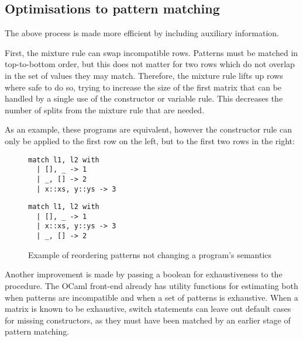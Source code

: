 

\subsection{Optimisations to pattern matching}
The above process is made more efficient by including auxiliary information. %


First, the mixture rule can swap incompatible rows. Patterns must be matched in top-to-bottom order, but this does not matter for two rows which do not overlap in the set of values they may match. Therefore, the mixture rule lifts up rows where safe to do so, trying to increase the size of the first matrix that can be handled by a single use of the constructor or variable rule. This decreases the number of splits from the mixture rule that are needed. 

As an example, these programs are equivalent, however the constructor rule can only be applied to the first row on the left, but to the first two rows in the right:

\begin{figure}[H]
\hfill
\begin{minipage}{0.45\textwidth}
\begin{verbatim}
match l1, l2 with
  | [], _ -> 1
  | _, [] -> 2
  | x::xs, y::ys -> 3
\end{verbatim}
\end{minipage}\qquad
\begin{minipage}{0.45\textwidth}
\begin{verbatim}
match l1, l2 with
  | [], _ -> 1
  | x::xs, y::ys -> 3
  | _, [] -> 2
\end{verbatim}
\end{minipage}\hfill
\caption{Example of reordering patterns not changing a program's semantics}
\end{figure}

Another improvement is made by passing a boolean for exhaustiveness to the procedure. The OCaml front-end already has utility functions for estimating both when patterns are incompatible and when a set of patterns is exhaustive.%
When a matrix is known to be exhaustive, switch statements can leave out default cases for missing constructors, as they must have been matched by an earlier stage of pattern matching. 



